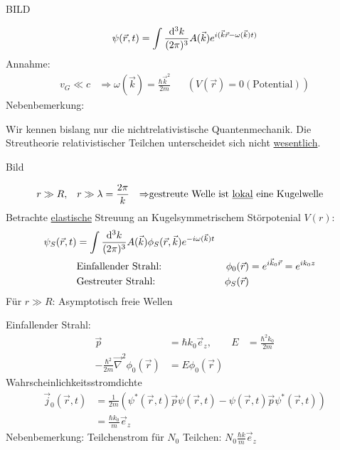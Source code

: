 	BILD
	
		\begin{equation*}
			\psi (\vec{r} , t) = 
			\int \frac{\mathrm{d}^3 k}{(2 \pi)^3} A(\vec{k}) e^{i(\vec{k} \vec{r} - \omega(\vec{k}) t)}
		\end{equation*}
	Annahme:
		\begin{align*}
			v_G \ll c &\Rightarrow \omega(\vec{k}) = \frac{\hbar \vec{k}^2}{2 m} & &(V(\vec{r}) = 0 (\text{Potential}))
		\end{align*}
	Nebenbemerkung:
	
	Wir kennen bislang nur die nichtrelativistische Quantenmechanik. Die Streutheorie relativistischer Teilchen unterscheidet sich nicht \underline{wesentlich}.
	
	Bild
	
		\begin{align*}
			r &\gg R ,& r &\gg \lambda = \frac{2 \pi}{k} &\Rightarrow 
			&\text{gestreute Welle ist \underline{lokal} eine Kugelwelle} 
		\end{align*}
	Betrachte \underline{elastische} Streuung an Kugelsymmetrischem Störpotenial $V(r)$:
		\begin{align*}
			\psi_S (\vec{r}, t) &= 
			\int \frac{\mathrm{d}^3 k}{(2 \pi)^3} A(\vec{k}) \phi_S (\vec{r}, \vec{k})
			e^{-i \omega (\vec{k}) t} \\
			&\text{Einfallender Strahl:} & \phi_0 (\vec{r}) &= e^{i \vec{k}_0 \vec{r}} = e^{i k_0 z}\\
			&\text{Gestreuter Strahl:} & \phi_S (\vec{r}) 
		\end{align*}
	Für $r \gg R$: Asymptotisch freie Wellen
	
	Einfallender Strahl:
		\begin{align*}
			\vec{p} &= \hbar k_0 \vec{e}_z ,& E &= \frac{\hbar^2 k_0}{2 m}\\
			-\frac{\hbar^2}{2 m} \vec{\nabla}^2 \phi_0 (\vec{r}) &= E \phi_0 (\vec{r})
		\end{align*}
	Wahrscheinlichkeitsstromdichte
		\begin{align*}
			\vec{j}_0 (\vec{r}, t) &=
			\frac{1}{2 m} 
			\left(\psi^* (\vec{r} , t) \vec{p} \psi (\vec{r}, t) - \psi (\vec{r}, t) \vec{p} \psi^* (\vec{r}, t)
			\right) \\
			&= \frac{\hbar k_0}{m} \vec{e}_z
		\end{align*}
	Nebenbemerkung: Teilchenstrom für $N_0$ Teilchen: $N_0 \frac{\hbar k}{m} \vec{e}_z$
	
